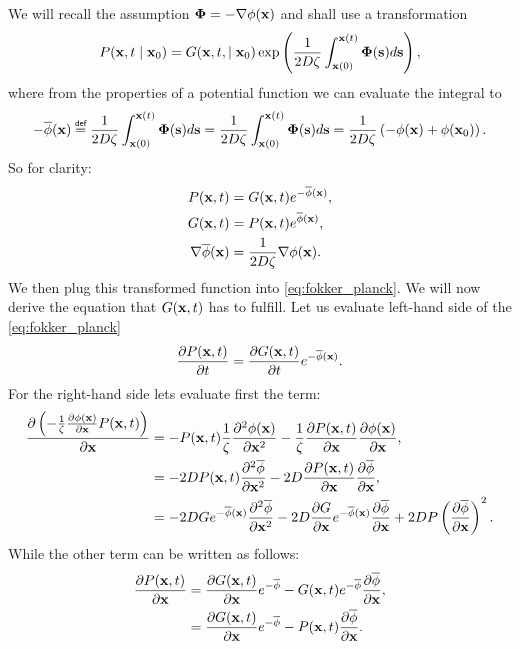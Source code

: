We will recall the assumption $\mathbf{\Phi} = - \nabla \phi(\mathbf{x})$ and shall use a transformation
\begin{equation}
\label{eq:useful_transform}
    P(\mathbf{x},t \mid \mathbf{x}_0) = G(\mathbf{x},t, \mid \mathbf{x}_0) \exp \left(\frac{1}{2D \zeta} \int_{\mathbf{x}(0)}^{\mathbf{x}(t)} \mathbf{\Phi}(\mathbf{s}) d\mathbf{s} \right),
\end{equation}
where from the properties of a potential function we can evaluate the integral to
\begin{equation}
    - \overline{\phi}(\xx) \myeq \frac{1}{2D \zeta}\int_{\xx(0)}^{\xx(t)} \mb{\Phi}(\es) d\es = \frac{1}{2D \zeta} \int_{\xx(0)}^{\xx(t)} \mb{\Phi}(\es) d\es = \frac{1}{2D \zeta} \left( -\phi(\xx) + \phi(\xx_0) \right).
\end{equation}
So for clarity:
\begin{align}
    P(\mathbf{x},t) &= G(\mathbf{x},t) e^{-\overline{\phi}(\mathbf{x})}, \\
    G(\mathbf{x},t) &= P(\mathbf{x},t) e^{\overline{\phi}(\mathbf{x})}, \\
    \nabla \overline{\phi}(\mathbf{x}) &= \frac{1}{2D \zeta} \nabla \phi(\mathbf{x}).
\end{align}
We then plug this transformed function into \eqref{eq:fokker_planck}.
We will now derive the equation that $G(\mathbf{x},t)$ has to fulfill. Let us evaluate left-hand side of the \eqref{eq:fokker_planck}
\begin{equation}
    \frac{\partial P(\mathbf{x}, t)}{\partial t} = \frac{\partial G(\mathbf{x},t)}{\partial t} e^{-\overline{\phi}(\mathbf{x})}.
\end{equation}
For the right-hand side lets evaluate first the term:
    \begin{align}
    \begin{split}
    \frac{\partial \left( - \frac{1}{\zeta}\frac{\partial{\phi(\mathbf{x})}}{{\partial \mathbf{x}}} P(\mathbf{x},t) \right)}{\partial \mathbf{x}}  &= 
    -  P(\mathbf{x},t) \frac{1}{\zeta} \frac{\partial^2{\phi(\mathbf{x})}}{{\partial \mathbf{x}^2}} - \frac{1}{\zeta}\frac{\partial P(\mathbf{x},t)}{\partial \mathbf{x}} \frac{\partial{\phi(\mathbf{x})}}{{\partial \mathbf{x}}} ,\\
    &= - 2D P(\mathbf{x},t) \frac{\partial^2{\overline{\phi}}}{{\partial \mathbf{x}^2}} -2D \frac{\partial P(\mathbf{x},t)}{\partial \mathbf{x}} \frac{\partial{\overline{\phi}}}{{\partial \mathbf{x}}},\\
    &= -2D G e^{-\overline{\phi}(\mathbf{x})} \frac{\partial^2{\overline{\phi}}}{{\partial \mathbf{x}^2}} - 2D \frac{\partial{G}}{{\partial \mathbf{x}}} e^{-\overline{\phi}(\mathbf{x})} \frac{\partial{\overline{\phi}}}{{\partial \mathbf{x}}} + 2D P \left( \frac{\partial{\overline{\phi}}}{{\partial \mathbf{x}}} \right)^2.
    \end{split}
\end{align}
While the other term can be written as follows:
\begin{equation}
    \begin{split}
        \frac{\partial{P(\mathbf{x},t)}}{{\partial \mathbf{x}}} &= \frac{\partial{G(\mathbf{x},t)}}{{\partial \mathbf{x}}} e^{-\overline{\phi}} - G(\mathbf{x},t) e^{-\overline{\phi}} \frac{\partial{\overline{\phi}}}{{\partial \mathbf{x}}}, \\ &= \frac{\partial{G(\mathbf{x},t)}}{{\partial \mathbf{x}}} e^{-\overline{\phi}} - P(\mathbf{x},t) \frac{\partial{\overline{\phi}}}{{\partial \mathbf{x}}}.
    \end{split}
\end{equation}
